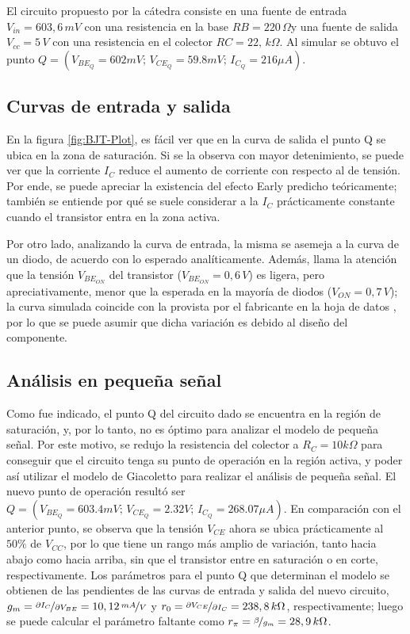 \documentclass[../main.tex]{subfiles}
\begin{document}
El circuito propuesto por la cátedra consiste en una fuente de entrada $V_{in} = 603,6\,mV$ con una resistencia en la base $RB=220\,\Omega$y una fuente de salida $V_{cc} = 5\,V$ con una resistencia en el colector $RC=22,\,k\Omega$. Al simular se obtuvo el punto $Q = (V_{BE_Q} = 602mV;\, V_{CE_Q}=59.8mV;\, I_{C_Q}=216\mu A)$. 

\subsection{Curvas de entrada y salida}
En la figura \ref{fig:BJT-Plot}, es fácil ver que en la curva de salida el punto Q se ubica en la zona de saturación. Si se la observa con mayor detenimiento, se puede ver que la corriente $I_C$ reduce el aumento de corriente con respecto al de tensión. Por ende, se puede apreciar la existencia del efecto Early predicho teóricamente; también se entiende por qué se suele considerar a la $I_C$ prácticamente constante cuando el transistor entra en la zona activa.

Por otro lado, analizando la curva de entrada, la misma se asemeja a la curva de un diodo, de acuerdo con lo esperado analíticamente. Además, llama la atención que la tensión $V_{BE_{ON}}$ del transistor ($V_{BE_{ON}} = 0,6\,V$) es ligera, pero apreciativamente, menor que la esperada en la mayoría de diodos ($V_{ON} = 0,7\,V$); la curva simulada coincide con la provista por el fabricante en la hoja de datos \cite{bc547b}, por lo que se puede asumir que dicha variación es debido al diseño del componente.



\subsection{Análisis en pequeña señal}
Como fue indicado, el punto Q del circuito dado se encuentra en la región de saturación, y, por lo tanto, no es óptimo para analizar el modelo de pequeña señal. Por este motivo, se redujo la resistencia del colector a $R_C=10k\Omega$ para conseguir que el circuito tenga su punto de operación en la región activa, y poder así utilizar el modelo de Giacoletto para realizar el análisis de pequeña señal. El nuevo punto de operación resultó ser $Q = \left(V_{BE_Q} = 603.4mV;\, V_{CE_Q}=2.32V;\, I_{C_Q}=268.07\mu A\right)$. En comparación con el anterior punto, se observa que la tensión $V_{CE}$ ahora se ubica prácticamente al $50\%$ de $V_{CC}$, por lo que tiene un rango más amplio de variación, tanto hacia abajo como hacia arriba, sin que el transistor entre en saturación o en corte, respectivamente. Los parámetros para el punto Q que determinan el modelo se obtienen de las pendientes de las curvas de entrada y salida del nuevo circuito, $g_m = \nicefrac{\partial I_C}{\partial V_{BE}} = 10,12\,\nicefrac{mA}{V}$ y $r_0=\nicefrac{\partial V_{CE}}{\partial I_C}=238,8\,k\Omega$, respectivamente; luego se puede calcular el parámetro faltante como $r_\pi=\nicefrac{\beta}{g_m}=28,9\,k\Omega$.
\end{document}
